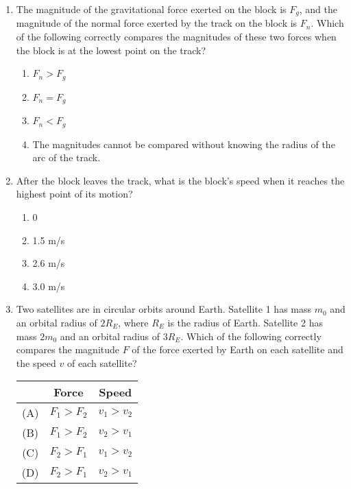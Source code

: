 \documentclass[11pt]{article}
\begin{document}
\begin{multicols}{2}
\begin{enumerate}[leftmargin=18pt,resume]
  \item The magnitude of the gravitational force exerted on the block is $F_g$,
    and the magnitude of the normal force exerted by the track on the block is
    $F_n$. Which of the following correctly compares the magnitudes of these
    two forces when the block is at the lowest point on the track?
    \begin{enumerate}[nosep,leftmargin=18pt,label=(\Alph*)]
    \item $F_n>F_g$
    \item $F_n=F_g$
    \item $F_n<F_g$
    \item The magnitudes cannot be compared without knowing the radius of the
      arc of the track.
    \end{enumerate}
    \vspace{.7in}
    
  \item After the block leaves the track, what is the block's speed when it
    reaches the highest point of its motion?
    \begin{enumerate}[nosep,leftmargin=18pt,label=(\Alph*)]
    \item 0
    \item 1.5 m/s
    \item 2.6 m/s
    \item 3.0 m/s
    \end{enumerate}
    \label{last}
    \vspace{.7in}
    
  \item Two satellites are in circular orbits around Earth. Satellite 1 has
    mass $m_0$ and an orbital radius of $2R_E$, where $R_E$ is the radius of
    Earth. Satellite 2 has mass $2m_0$ and an orbital radius of $3R_E$. Which
    of the following correctly compares the magnitude $F$ of the force exerted
    by Earth on each satellite and the speed $v$ of each satellite?

    \begin{tabular}{ccc}
      & Force & Speed\\
      \hline
      (A)  & $F_1 > F_2$ & $v_1 > v_2$ \\
      (B)  & $F_1 > F_2$ & $v_2 > v_1$ \\
      (C)  & $F_2 > F_1$ & $v_1 > v_2$ \\
      (D)  & $F_2 > F_1$ & $v_2 > v_1$
    \end{tabular}    
    \columnbreak
    

\end{enumerate}
\end{multicols}
\end{document}

